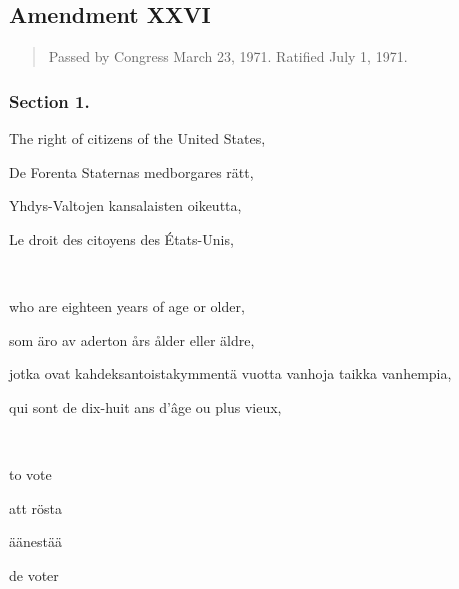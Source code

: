 \documentclass[a4paper,landscape,12pt]{article}
\begin{document}
\subsection*{Amendment XXVI}
\begin{quote}\small
	Passed by Congress March 23, 1971. Ratified July 1, 1971.
\end{quote}
\subsubsection*{Section 1.}
\begin{minipage}[t]{0.22\textwidth}
	The right of citizens of the United States,
\end{minipage}\textwidth
\begin{minipage}[t]{0.22\textwidth}
	De Forenta Staternas medborgares rätt,
\end{minipage}\textwidth
\begin{minipage}[t]{0.22\textwidth}
	Yhdys-Valtojen kansalaisten oikeutta,
\end{minipage}\textwidth
\begin{minipage}[t]{0.22\textwidth}
	Le droit des citoyens des États-Unis,
\end{minipage}

~

\begin{minipage}[t]{0.22\textwidth}
who are eighteen years of age or older,
\end{minipage}\textwidth
\begin{minipage}[t]{0.22\textwidth}
som äro av aderton års ålder eller äldre,
\end{minipage}\textwidth
\begin{minipage}[t]{0.22\textwidth}
jotka ovat kahdeksantoistakymmentä vuotta vanhoja taikka vanhempia,
\end{minipage}\textwidth
\begin{minipage}[t]{0.22\textwidth}
	qui sont de dix-huit ans d'âge ou plus vieux,
\end{minipage}

~

\begin{minipage}[t]{0.22\textwidth}
to vote
\end{minipage}\textwidth
\begin{minipage}[t]{0.22\textwidth}
att rösta
\end{minipage}\textwidth
\begin{minipage}[t]{0.22\textwidth}
äänestää
\end{minipage}\textwidth
\begin{minipage}[t]{0.22\textwidth}
de voter
\end{minipage}
\end{document}
